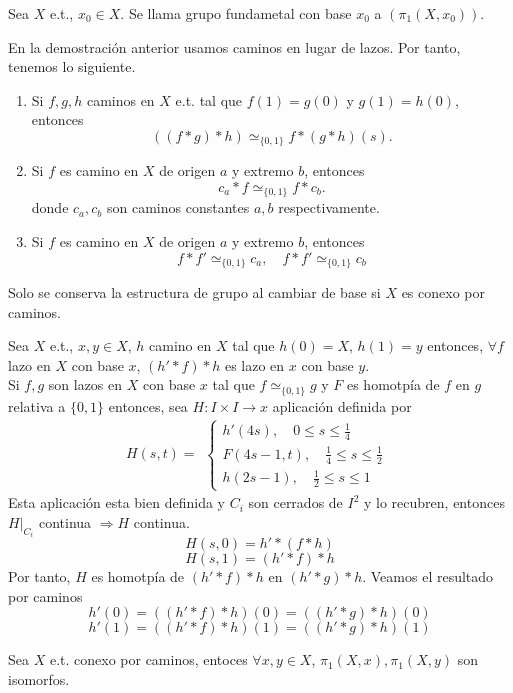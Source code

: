 
\begin{defn}
  Sea $X$ e.t., $x_{0} \in X$. Se llama grupo fundametal con base $x_{0}$ a $(\pi_{1}(X, x_{0}))$.
\end{defn}

\begin{obs}
  En la demostración anterior usamos caminos en lugar de lazos. Por tanto, tenemos lo siguiente.
  \begin{enumerate}[label=(\roman*)]
    \item Si $f,g,h$ caminos en $X$ e.t. tal que $f(1) = g(0)$ y $g(1) = h(0)$, entonces
      \[ 
        ((f*g) * h) \simeq_{\{ 0,1 \}} f * ( g* h)(s).
      \] 
    \item Si $f$ es camino en $X$ de origen $a$ y extremo $b$, entonces
      \[ 
        c_{a} * f \simeq_{\{ 0, 1 \}} f * c_{b}.
      \] 
      donde $c_{a}, c_{b}$ son caminos constantes $a, b$ respectivamente.
    \item Si $f$ es camino en $X$ de origen $a$ y extremo $b$, entonces
      \[ 
        f * f' \simeq_{\{ 0, 1 \}} c_{a}, \quad f * f' \simeq_{\{ 0, 1 \}} c_{b}
      \] 
  \end{enumerate}
\end{obs}

\begin{obs}
  Solo se conserva la estructura de grupo al cambiar de base si $X$ es conexo por caminos.
\end{obs}

\begin{obs}
  Sea $X$ e.t., $x, y \in X$, $h$ camino en $X$ tal que $h(0) = X$, $h(1) = y$ entonces, $\forall f$ lazo en $X$ con base $x$, $(h' * f) * h$ es lazo en $x$ con base $y$. \\

  Si $f,g$ son lazos en $X$ con base $x$ tal que $f \simeq_{\{ 0, 1 \}} g$ y $F$ es homotpía de $f$ en $g$ relativa a $\{ 0, 1 \}$ entonces, sea $H : I \times I \to x$ aplicación definida por
  \[ 
    H(s,t) =
    \begin{aligned}
      \begin{cases}
        h'(4s), \quad 0 \leq s \leq \frac{1}{4} \\
        F(4s - 1, t), \quad \frac{1}{4} \leq s \leq \frac{1}{2} \\
        h(2s - 1), \quad \frac{1}{2} \leq s \leq 1
      \end{cases}
    \end{aligned}
  \] 
  Esta aplicación esta bien definida y $C_{i}$ son cerrados de $I^{2}$ y lo recubren, entonces $H|_{C_{i}}$ continua $\Rightarrow H$ continua.
  \[ 
    H(s,0) = h' * (f * h)
  \] 
  \[ 
    H(s,1) = (h' * f) * h 
  \] 
  Por tanto, $H$ es homotpía de $(h' * f) * h$ en $(h' * g) * h$. Veamos el resultado por caminos
  \[ 
    h'(0) = ((h' * f) * h)(0) = ((h' * g) * h)(0) 
  \] 
  \[ 
    h'(1) = ((h' * f) * h)(1) = ((h' * g) * h)(1)
  \] 
\end{obs} 

\begin{prop}
  Sea $X$ e.t. conexo por caminos, entoces $\forall x, y \in X$, $\pi_{1}(X,x), \pi_{1}(X, y)$ son isomorfos.
\end{prop}
